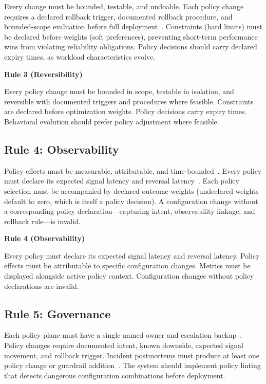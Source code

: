 \documentclass[conference]{IEEEtran}
\newenvironment{majorrule}[1]{%
    \vspace{0.5em}\noindent
    \colorbox{rulecolor!10!white}{%
        \parbox{\dimexpr\linewidth-2\fboxsep}{%
            \vspace{0.3em}\small\textbf{\textcolor{rulecolor}{Rule #1}}\vspace{0.2em}%
        }%
    }%
}{\vspace{0.5em}}
\begin{document}
Every change must be bounded, testable, and undoable. Each policy change requires a declared rollback trigger, documented rollback procedure, and bounded-scope evaluation before full deployment~\cite{sre}. Constraints (hard limits) must be declared before weights (soft preferences), preventing short-term performance wins from violating reliability obligations. Policy decisions should carry declared expiry times, as workload characteristics evolve.

\begin{majorrule}{3 (Reversibility)}
Every policy change must be bounded in scope, testable in isolation, and reversible with documented triggers and procedures where feasible. Constraints are declared before optimization weights. Policy decisions carry expiry times. Behavioral evolution should prefer policy adjustment where feasible.
\end{majorrule}

\subsection{Rule 4: Observability}

Policy effects must be measurable, attributable, and time-bounded~\cite{observability2026}. Every policy must declare its expected signal latency and reversal latency~\cite{controltheory}. Each policy selection must be accompanied by declared outcome weights (undeclared weights default to zero, which is itself a policy decision). A configuration change without a corresponding policy declaration---capturing intent, observability linkage, and rollback rule---is invalid.

\begin{majorrule}{4 (Observability)}
Every policy must declare its expected signal latency and reversal latency. Policy effects must be attributable to specific configuration changes. Metrics must be displayed alongside active policy context. Configuration changes without policy declarations are invalid.
\end{majorrule}

\subsection{Rule 5: Governance}

Each policy plane must have a single named owner and escalation backup~\cite{leveson,pourmajidi2025governance,cncf2023policy,cncf2023governance}. Policy changes require documented intent, known downside, expected signal movement, and rollback trigger. Incident postmortems must produce at least one policy change or guardrail addition~\cite{sre}. The system should implement policy linting that detects dangerous configuration combinations before deployment.
\end{document}
